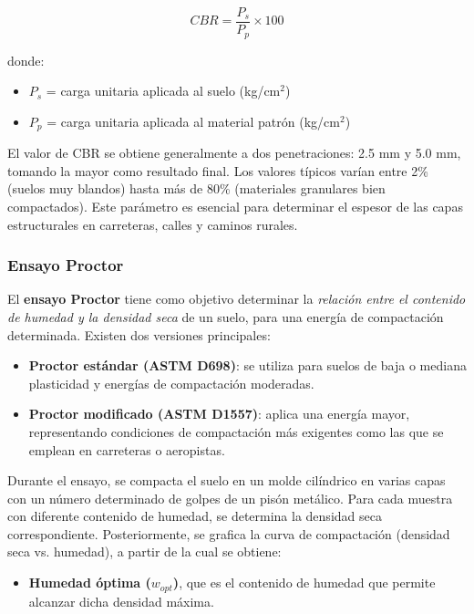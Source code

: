 \documentclass[12pt]{article}
\begin{document}
	\[
	CBR = \frac{P_s}{P_p} \times 100
	\]
	
	donde:
	\begin{itemize}
		\item \( P_s \) = carga unitaria aplicada al suelo (kg/cm\(^2\))
		\item \( P_p \) = carga unitaria aplicada al material patrón (kg/cm\(^2\))
	\end{itemize}
	
	El valor de CBR se obtiene generalmente a dos penetraciones: 2.5 mm y 5.0 mm, tomando la mayor como resultado final. Los valores típicos varían entre 2\% (suelos muy blandos) hasta más de 80\% (materiales granulares bien compactados). Este parámetro es esencial para determinar el espesor de las capas estructurales en carreteras, calles y caminos rurales.
	
	\vspace{0.5cm}
	
	\subsubsection{Ensayo Proctor}
	
	El \textbf{ensayo Proctor} tiene como objetivo determinar la \textit{relación entre el contenido de humedad y la densidad seca} de un suelo, para una energía de compactación determinada. Existen dos versiones principales:
	\begin{itemize}
		\item \textbf{Proctor estándar (ASTM D698)}: se utiliza para suelos de baja o mediana plasticidad y energías de compactación moderadas.
		\item \textbf{Proctor modificado (ASTM D1557)}: aplica una energía mayor, representando condiciones de compactación más exigentes como las que se emplean en carreteras o aeropistas.
	\end{itemize}
	
	Durante el ensayo, se compacta el suelo en un molde cilíndrico en varias capas con un número determinado de golpes de un pisón metálico. Para cada muestra con diferente contenido de humedad, se determina la densidad seca correspondiente. Posteriormente, se grafica la curva de compactación (densidad seca vs. humedad), a partir de la cual se obtiene:
	\begin{itemize}
	
		\item \textbf{Humedad óptima (\( w_{opt} \))}, que es el contenido de humedad que permite alcanzar dicha densidad máxima.
	\end{itemize}
	
\end{document}
